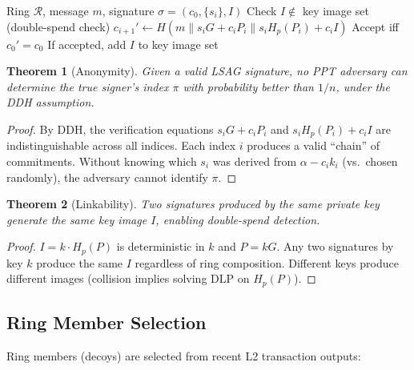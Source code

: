 \documentclass[11pt,a4paper]{article}
\newtheorem{theorem}{Theorem}[section]
\begin{document}
\begin{algorithm}[H]
\caption{LSAG Ring Signature Verification}
\label{alg:lsag-verify}
\begin{algorithmic}[1]
\Require Ring $\mathcal{R}$, message $m$, signature $\sigma = (c_0, \{s_i\}, I)$
\State Check $I \notin$ key image set (double-spend check)
    \State $c_{i+1}' \gets H(m \| s_i G + c_i P_i \|
        s_i H_p(P_i) + c_i I)$
\EndFor
\State Accept iff $c_0' = c_0$
\State If accepted, add $I$ to key image set
\end{algorithmic}
\end{algorithm}

\begin{theorem}[Anonymity]
    Given a valid LSAG signature, no PPT adversary can determine the
    true signer's index $\pi$ with probability better than $1/n$, under
    the DDH assumption.
\end{theorem}

\begin{proof}
    By DDH, the verification equations $s_i G + c_i P_i$ and
    $s_i H_p(P_i) + c_i I$ are indistinguishable across all indices.
    Each index $i$ produces a valid ``chain'' of commitments.  Without
    knowing which $s_i$ was derived from $\alpha - c_i k_i$ (vs.\ chosen
    randomly), the adversary cannot identify $\pi$.
\end{proof}

\begin{theorem}[Linkability]
    Two signatures produced by the same private key generate the same
    key image $I$, enabling double-spend detection.
\end{theorem}

\begin{proof}
    $I = k \cdot H_p(P)$ is deterministic in $k$ and $P = kG$.  Any two
    signatures by key $k$ produce the same $I$ regardless of ring
    composition.  Different keys produce different images (collision
    implies solving DLP on $H_p(P)$).
\end{proof}

\subsection{Ring Member Selection}

Ring members (decoys) are selected from recent L2 transaction outputs:
\end{document}
